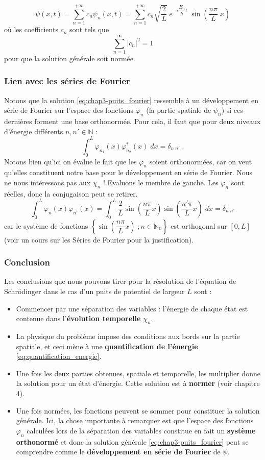 \documentclass{book}
\begin{document}
\begin{equation}\label{eq:chap3-puits_fourier}
  \psi(x,t) = \sum_{n=1} ^{+\infty} c_n \psi_n(x,t)  = \sum_{n=1} ^{+\infty} c_n \sqrt{\dfrac{2 }{L}} \; e^{-i \dfrac{E_n}{\hbar}t} \; \sin\left(\dfrac{n\pi}{L} \; x\right)
\end{equation}
où les coefficients $c_n$ sont tels que 
$$
\sum_{n=1} ^{\infty} |c_n|^2 = 1
$$
pour que la solution générale soit normée. 

\subsubsection{Lien avec les séries de Fourier}
Notons que la solution \eqref{eq:chap3-puits_fourier} ressemble à un développement en série de Fourier sur l'espace des fonctions $\varphi_n$ (la partie spatiale de $\psi_n$) si ces-dernières forment une base orthonormée. Pour cela, il faut que pour deux niveaux d'énergie différents $n, n' \in \mathbb{N}$ :
$$
\int_0 ^L \varphi_{n_1}(x) \varphi_{n_2}^*(x) \; dx = \delta_{n\; n'} \; .
$$
Notons bien qu'ici on évalue le fait que les $\varphi_n$ soient orthonormées, car on veut qu'elles constituent notre base pour le développement en série de Fourier. Nous ne nous intéressons pas aux $\chi_n$ ! Evaluons le membre de gauche. Les $\varphi_n$ sont réelles, donc la conjugaison peut se retirer.
$$
\int_0 ^L \varphi_n(x) \varphi_{n'}(x) = 
\int_0 ^L \dfrac{2 }{L} \sin\left(\dfrac{n\pi}{L} x\right)\sin\left(\dfrac{n'\pi}{L} x\right) \; dx = \delta_{n\; n'}
$$
car le système de fonctions $\left\{\sin\left(\dfrac{n\pi}{L} x\right)\; ; n\in\mathbb{N}_0\right\}$ est orthogonal sur $[0,L]$ (voir un cours sur les Séries de Fourier pour la justification).

\subsubsection{Conclusion}
Les conclusions que nous pouvons tirer pour la résolution de l'équation de Schrödinger dans le cas d'un puits de potentiel de largeur $L$ sont :
\begin{itemize}
  \item Commencer par une séparation des variables : l'énergie de chaque état est contenue dans l'\textbf{évolution temporelle} $\chi_n$.
  \item La physique du problème impose des conditions aux bords sur la partie spatiale, et ceci mène à une \textbf{quantification de l'énergie} \eqref{eq:quantification_energie}.
  \item Une fois les deux parties obtenues, spatiale et temporelle, les multiplier donne la solution pour un état d'énergie. Cette solution est à \textbf{normer} (voir chapitre 4).
  \item Une fois normées, les fonctions peuvent se sommer pour constituer la solution générale. Ici, la chose importante à remarquer est que l'espace des fonctions $\varphi_n$ calculées lors de la séparation des variables constitue en fait un \textbf{système orthonormé} et donc la solution générale \eqref{eq:chap3-puits_fourier} peut se comprendre comme le \textbf{développement en série de Fourier} de $\psi$.
\end{itemize}
\end{document}
